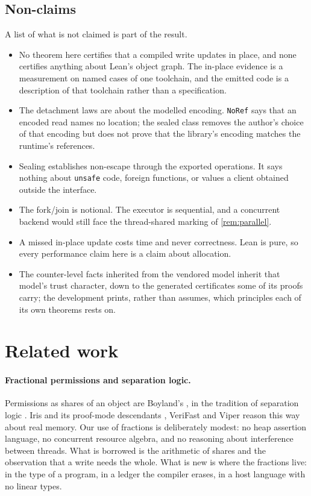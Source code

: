 \documentclass[11pt,a4paper]{article}
\theoremstyle{definition}
\theoremstyle{plain}
\newcommand{\code}[1]{\texttt{#1}}
\newcommand{\Code}[1]{\texttt{#1}}
\begin{document}
\subsection{Non-claims}

A list of what is not claimed is part of the result.

\begin{itemize}[leftmargin=1.4em,itemsep=2pt]
\item No theorem here certifies that a compiled write updates in place, and none
certifies anything about Lean's object graph. The in-place evidence is a
measurement on named cases of one toolchain, and the emitted code is a
description of that toolchain rather than a specification.
\item The detachment laws are about the modelled encoding. \Code{NoRef} says that
an encoded read names no location; the sealed class removes the author's choice
of that encoding but does not prove that the library's encoding matches the
runtime's references.
\item Sealing establishes non-escape through the exported operations. It says
nothing about \code{unsafe} code, foreign functions, or values a client obtained
outside the interface.
\item The fork/join is notional. The executor is sequential, and a concurrent
backend would still face the thread-shared marking of \cref{rem:parallel}.
\item A missed in-place update costs time and never correctness. Lean is pure,
so every performance claim here is a claim about allocation.
\item The counter-level facts inherited from the vendored model inherit that
model's trust character, down to the generated certificates some of its proofs
carry; the development prints, rather than assumes, which principles each of its
own theorems rests on.
\end{itemize}

\section{Related work}\label{sec:related}

\paragraph{Fractional permissions and separation logic.}
Permissions as shares of an object are Boyland's
\cite{boyland2003checking}, in the tradition of separation logic
\cite{ohearn2001local,reynolds2002separation}. Iris \cite{jung2015iris} and its
proof-mode descendants \cite{krebbers2017essence}, VeriFast
\cite{jacobs2011verifast} and Viper \cite{muller2016viper} reason this way about
real memory. Our use of fractions is deliberately modest: no heap assertion
language, no concurrent resource algebra, and no reasoning about interference
between threads. What is borrowed is the arithmetic of shares and the
observation that a write needs the whole. What is new is where the fractions
live: in the type of a program, in a ledger the compiler erases, in a host
language with no linear types.
\end{document}
